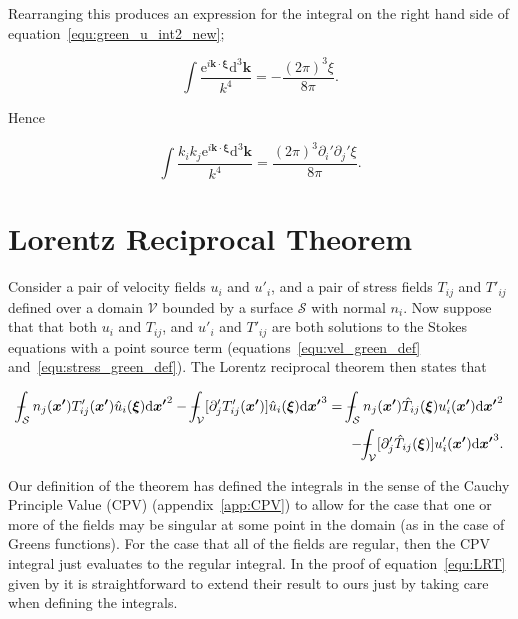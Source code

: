 \documentclass[12pt]{article}
\def\Xint#1{\mathchoice
{\XXint\displaystyle\textstyle{#1}}%
{\XXint\textstyle\scriptstyle{#1}}%
{\XXint\scriptstyle\scriptscriptstyle{#1}}%
{\XXint\scriptscriptstyle\scriptscriptstyle{#1}}%
\!\int}
\def\XXint#1#2#3{{\setbox0=\hbox{$#1{#2#3}{\int}$}
\vcenter{\hbox{$#2#3$}}\kern-.5\wd0}}
\def\dashint{\Xint-}
\begin{document}
Rearranging this produces an expression for the integral on the right hand side of equation~\ref{equ:green_u_int2_new};

\begin{equation}
\label{equ:green_u_int2_new_express}
\int \frac{\mathrm{e}^{i \boldsymbol{k} \cdot \boldsymbol{\xi}} \mathrm{d}^{3} \boldsymbol{k}}{k^{4}} = -\frac{(2 \pi)^{3} \xi}{8 \pi} .
\end{equation}

Hence

\begin{equation}
\label{equ:green_u_int2}
\int \frac{k_{i} k_{j} \mathrm{e}^{i \boldsymbol{k} \cdot \boldsymbol{\xi}} \mathrm{d}^{3} \boldsymbol{k}}{k^{4}} = \frac{(2 \pi)^{3} \partial_{i}' \partial_{j}' \xi}{8 \pi} .
\end{equation}


\section{Lorentz Reciprocal Theorem}
\label{app:Lorentz}

Consider a pair of velocity fields $u_{i}$ and $u'_{i}$, and a pair of stress fields $T_{ij}$ and $T'_{ij}$ defined over a domain $\mathcal{V}$ bounded by a surface $\mathcal{S}$ with normal $n_{i}$. Now suppose that that both $u_{i}$ and $T_{ij}$, and $u'_{i}$ and $T'_{ij}$ are both solutions to the Stokes equations with a point source term (equations~\ref{equ:vel_green_def} and~\ref{equ:stress_green_def}). The Lorentz reciprocal theorem then states that \citep{Kim05}

\begin{align}
\label{equ:LRT}
\dashint_{\mathcal{S}} n_{j}(\boldsymbol{x'}) T'_{ij}(\boldsymbol{x'}) \hat{u}_{i}(\boldsymbol{\xi}) \mathrm{d} \boldsymbol{x'}^{2} - \dashint_{\mathcal{V}} [\partial'_{j} T'_{ij}(\boldsymbol{x'})] \hat{u}_{i}(\boldsymbol{\xi}) \mathrm{d} \boldsymbol{x'}^{3} = \dashint_{\mathcal{S}} n_{j}(\boldsymbol{x'}) \hat{T}_{ij}(\boldsymbol{\xi}) u'_{i}(\boldsymbol{x'}) \mathrm{d} \boldsymbol{x'}^{2} \nonumber \\
- \dashint_{\mathcal{V}} [\partial'_{j}\hat{T}_{ij}(\boldsymbol{\xi})] u'_{i}(\boldsymbol{x'}) \mathrm{d} \boldsymbol{x'}^{3} .
\end{align}

Our definition of the theorem has defined the integrals in the sense of the Cauchy Principle Value (CPV) (appendix~\ref{app:CPV}) to allow for the case that one or more of the fields may be singular at some point in the domain (as in the case of Greens functions). For the case that all of the fields are regular, then the CPV integral just evaluates to the regular integral. In the proof of equation~\ref{equ:LRT} given by \citet{Kim05} it is straightforward to extend their result to ours just by taking care when defining the integrals. 
\end{document}
